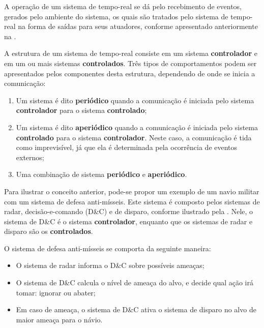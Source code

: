 
A operação de um sistema de tempo-real se dá pelo recebimento de eventos, gerados pelo ambiente do sistema, os quais são tratados pelo sistema de tempo-real na forma de saídas para seus atuadores, conforme apresentado anteriormente na .

A estrutura de um sistema de tempo-real consiste em um sistema \textbf{controlador} e em um ou mais sistemas \textbf{controlados}. Três tipos de comportamentos podem ser apresentados pelos componentes desta estrutura, dependendo de onde se inicia a comunicação:

\begin{enumerate}
	\item Um sistema é dito \textbf{periódico} quando a comunicação é iniciada pelo sistema \textbf{controlador} para o sistema \textbf{controlado};
	\item Um sistema é dito \textbf{aperiódico} quando a comunicação é iniciada pelo sistema \textbf{controlado} para o sistema \textbf{controlador}. Neste caso, a comunicação é tida como imprevisível, já que ela é determinada pela ocorrência de eventos externos;
	\item Uma combinação de sistema \textbf{periódico} e \textbf{aperiódico}.
\end{enumerate}

Para ilustrar o conceito anterior, pode-se propor um exemplo de um navio militar com um sistema de defesa anti-mísseis. Este sistema é composto pelos sistemas de radar, decisão-e-comando (D\&C) e de disparo, conforme ilustrado pela . Nele, o sistema de D\&C é o sistema \textbf{controlador}, enquanto que os sistemas de radar e disparo são os \textbf{controlados}.


O sistema de defesa anti-mísseis se comporta da seguinte maneira:

\begin{itemize}
	\item O sistema de radar informa o D\&C sobre possíveis ameaças;
	\item O sistema de D\&C calcula o nível de ameaça do alvo, e decide qual ação irá tomar: ignorar ou abater;
	\item Em caso de ameaça, o sistema de D\&C ativa o sistema de disparo no alvo de maior ameaça para o návio.
\end{itemize}

